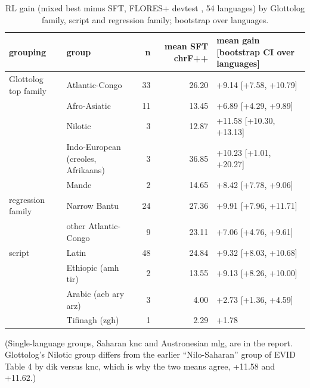 \begin{table}[t]
\centering\scriptsize
\setlength{\tabcolsep}{4pt}
\caption{RL gain (mixed best minus SFT, FLORES+ devtest \chrfpp{}, 54 languages) by Glottolog family, script and regression family; bootstrap over languages.}\label{tab:family}
\begin{tabularx}{\linewidth}{@{}l>{\raggedright\arraybackslash}Xrr>{\raggedright\arraybackslash}X@{}}
\toprule
grouping & group & n & mean SFT chrF++ & mean gain [bootstrap CI over languages] \\
\midrule
Glottolog top family & Atlantic-Congo & 33 & 26.20 & +9.14 [+7.58, +10.79] \\
 & Afro-Asiatic & 11 & 13.45 & +6.89 [+4.29, +9.89] \\
 & Nilotic & 3 & 12.87 & +11.58 [+10.30, +13.13] \\
 & Indo-European (creoles, Afrikaans) & 3 & 36.85 & +10.23 [+1.01, +20.27] \\
 & Mande & 2 & 14.65 & +8.42 [+7.78, +9.06] \\
regression family & Narrow Bantu & 24 & 27.36 & +9.91 [+7.96, +11.71] \\
 & other Atlantic-Congo & 9 & 23.11 & +7.06 [+4.76, +9.61] \\
script & Latin & 48 & 24.84 & +9.32 [+8.03, +10.68] \\
 & Ethiopic (amh tir) & 2 & 13.55 & +9.13 [+8.26, +10.00] \\
 & Arabic (aeb ary arz) & 3 & 4.00 & +2.73 [+1.36, +4.59] \\
 & Tifinagh (zgh) & 1 & 2.29 & +1.78 \\
\bottomrule
\end{tabularx}
\end{table}

(Single-language groups, Saharan knc and Austronesian mlg, are in the report. Glottolog's Nilotic group differs from the earlier ``Nilo-Saharan'' group of EVID Table 4 by dik versus knc, which is why the two means agree, +11.58 and +11.62.)

